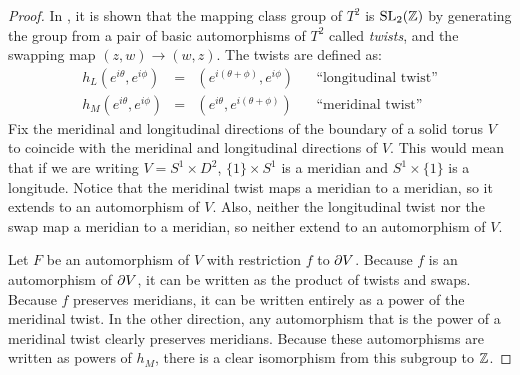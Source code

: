 \begin{proof}
	In \cite{Rolf76}, it is shown that the mapping class group of $T^2$ is $\textrm{SL}_2(\mathbb{Z})$ by generating the group from a pair of basic automorphisms of $T^2$ called \emph{twists}, and the swapping map $(z,w)\to(w,z)$.
	The twists are defined as:
	\[
	\begin{array}{ccccc}
	h_L(e^{i\theta},e^{i\phi}) & = & (e^{i(\theta+\phi)},e^{i\phi}) & & \textrm{``longitudinal twist''} \\
	
	h_M(e^{i\theta},e^{i\phi}) & = & (e^{i\theta},e^{i(\theta+\phi)}) & & \textrm{``meridinal twist''}	
	\end{array}
	\]
	Fix the meridinal and longitudinal directions of the boundary of a solid torus $V$ to coincide with the meridinal and longitudinal directions of $V$.
	This would mean that if we are writing $V=S^1\times D^2$, $\{1\}\times S^1$ is a meridian and $S^1\times\{1\}$ is a longitude.
	Notice that the meridinal twist maps a meridian to a meridian, so it extends to an automorphism of $V$.
	Also, neither the longitudinal twist nor the swap map a meridian to a meridian, so neither extend to an automorphism of $V$.
	
	Let $F$ be an automorphism of $V$ with restriction $f$ to $\partial V$.
	Because $f$ is an automorphism of $\partial V$, it can be written as the product of twists and swaps.
	Because $f$ preserves meridians, it can be written entirely as a power of the meridinal twist.
	In the other direction, any automorphism that is the power of a meridinal twist clearly preserves meridians.
	Because these automorphisms are written as powers of $h_M$, there is a clear isomorphism from this subgroup to $\mathbb{Z}$.
\end{proof}

